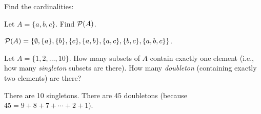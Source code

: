 \begin{questions}
  

\question Find the cardinalities:

  \begin{answer}
  \end{answer}


  
  
\question Let $A = \{a, b, c\}$.  Find $\mathcal P(A)$.

  \begin{answer}
    $\mathcal P(A) = \{\emptyset, \{a\}, \{b\}, \{c\}, \{a,b\}, \{a,c\}, \{b,c\}, \{a,b,c\}\}$.
  \end{answer}

  
  

\question Let $A = \{1,2,\ldots, 10\}$.  How many subsets of $A$ contain exactly one element (i.e., how many {\em singleton} subsets are there).  How many {\em doubleton} (containing exactly two elements) are there?

  \begin{answer}
      There are 10 singletons.  There are 45 doubletons (because $45 = 9+8+7+\cdots+2+1$).
  \end{answer}



\end{questions}
